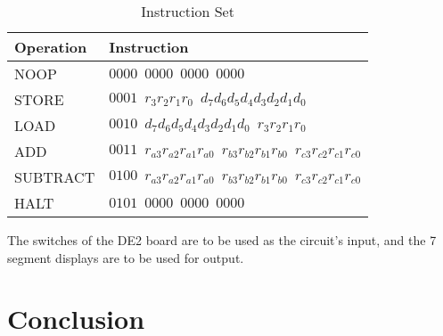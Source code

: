 \documentclass[12pt]{article}
\begin{document}
\begin{table}[htbp]
    \centering
    \begin{tabular}{ll}                                                                                                                 \\\toprule
        \textbf{Operation}  & \textbf{Instruction}                                                                                      \\\midrule
        NOOP                & $0000 \;\: 0000 \;\: 0000 \;\: 0000$                                                                      \\
        STORE               & $0001 \;\: r_3 r_2 r_1 r_0 \;\: d_7 d_6 d_5 d_4 d_3 d_2 d_1 d_0$                                          \\
        LOAD                & $0010 \;\: d_7 d_6 d_5 d_4 d_3 d_2 d_1 d_0 \;\: r_3 r_2 r_1 r_0$                                          \\
        ADD                 & $0011 \;\: r_{a3} r_{a2} r_{a1} r_{a0} \;\: r_{b3} r_{b2} r_{b1} r_{b0} \;\: r_{c3} r_{c2} r_{c1} r_{c0}$ \\
        SUBTRACT            & $0100 \;\: r_{a3} r_{a2} r_{a1} r_{a0} \;\: r_{b3} r_{b2} r_{b1} r_{b0} \;\: r_{c3} r_{c2} r_{c1} r_{c0}$ \\
        HALT                & $0101 \;\: 0000 \;\: 0000 \;\: 0000$                                                                      \\\bottomrule
    \end{tabular}
    \caption{Instruction Set}
    \label{tab:instructions}
\end{table}

The switches of the DE2 board are to be used as the circuit’s input, and the 7 segment displays are to be used for output.

\FloatBarrier  \FloatBarrier \clearpage
\FloatBarrier  \FloatBarrier \clearpage
\FloatBarrier  \FloatBarrier \clearpage
\FloatBarrier  \FloatBarrier \clearpage
\FloatBarrier  \FloatBarrier \clearpage

\FloatBarrier \section{Conclusion} \clearpage

\FloatBarrier 
\end{document}
